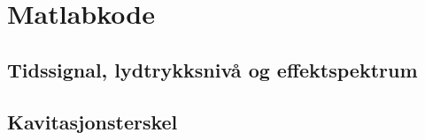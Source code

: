 \section{Matlabkode}
\subsection{Tidssignal, lydtrykksnivå og effektspektrum}
\label{sec:Kode}

\subsection{Kavitasjonsterskel}
\label{sec:kavitasjonsterskelKode}

